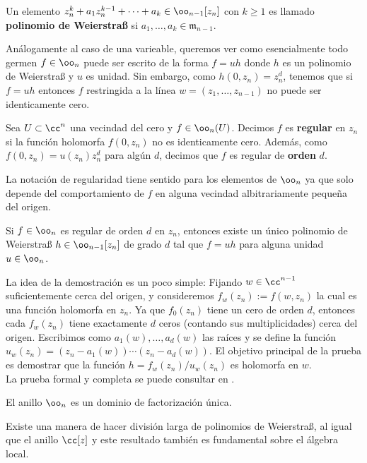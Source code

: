 \begin{definition}
	Un elemento $z_n^k+a_1z_n^{k-1}+\cdots+a_k\in\oo_{n-1}[z_n]$ con $k\geq 1$ es llamado \textbf{polinomio de Weierstraß} si $a_1,\dots,a_k\in \mathfrak{m}_{n-1}$.
\end{definition}
Análogamente al caso de una varieable, queremos ver como esencialmente todo germen $f\in\oo_n$ puede ser escrito de la forma $f=uh$ donde $h$ es un polinomio de Weierstraß y $u$ es unidad. Sin embargo, como $h(0,z_n)=z_n^d$, tenemos que si $f=uh$ entonces $f$ restringida a la línea $w=(z_1,\dots,z_{n-1})$ no puede ser identicamente cero.  
\begin{definition}
	Sea $U\subset\cc^n$ una vecindad del cero y $f\in\oo_n(U)$. Decimos $f$ es \textbf{regular} en $z_n$ si la función holomorfa $f(0,z_n)$ no es identicamente cero. Además, como $f(0,z_n)=u(z_n)z_n^d$ para algún $d$, decimos que $f$ es regular de \textbf{orden} $d$.
\end{definition}
La notación de regularidad tiene sentido para los elementos de $\oo_n$ ya que solo depende del comportamiento de $f$ en alguna vecindad albitrariamente pequeña del origen.

\begin{theorem}
	Si $f\in\oo_n$ es regular de orden $d$ en $z_n$, entonces existe un único polinomio de Weierstraß $h\in\oo_{n-1}[z_n]$ de grado $d$ tal que $f=uh$ para alguna unidad $u\in\oo_n$.
\end{theorem}
La idea de la demostración es un poco simple: Fijando $w\in\cc^{n-1}$ suficientemente cerca del origen, y consideremos $f_w(z_n):=f(w,z_n)$ la cual es una función holomorfa en $z_n$. Ya que $f_0(z_n)$ tiene un cero de orden $d$, entonces cada $f_w(z_n)$ tiene exactamente $d$ ceros (contando sus multiplicidades) cerca del origen. Escribimos como $a_1(w),\dots,a_d(w)$ las raíces y se define la función $u_w(z_n)=(z_n-a_1(w))\cdots(z_n-a_d(w))$. El objetivo principal de la prueba es demostrar que la función $h=f_w(z_n)/u_w(z_n)$ es holomorfa en $w$.\\
La prueba formal y completa se puede consultar en \parencite[Cap. 1, Sec, 1.1, Prop. 1.1.6]{huybrechts2005complex}.

\begin{propo}\label{anillodfu}
	El anillo $\oo_{n}$ es un dominio de factorización única.
\end{propo}

Existe una manera de hacer división larga de polinomios de Weierstraß, al igual que el anillo $\cc[z]$ y este resultado también es fundamental sobre el álgebra local.

